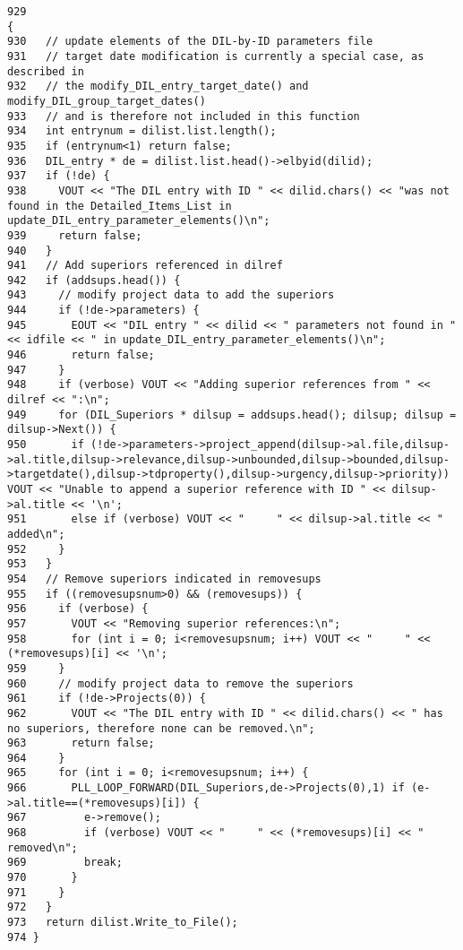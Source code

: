 \footnotesize\begin{verbatim}929                                                                                                                                                                    {
930   // update elements of the DIL-by-ID parameters file
931   // target date modification is currently a special case, as described in
932   // the modify_DIL_entry_target_date() and modify_DIL_group_target_dates()
933   // and is therefore not included in this function
934   int entrynum = dilist.list.length();
935   if (entrynum<1) return false;
936   DIL_entry * de = dilist.list.head()->elbyid(dilid);
937   if (!de) {
938     VOUT << "The DIL entry with ID " << dilid.chars() << "was not found in the Detailed_Items_List in update_DIL_entry_parameter_elements()\n";
939     return false;
940   }
941   // Add superiors referenced in dilref
942   if (addsups.head()) {
943     // modify project data to add the superiors
944     if (!de->parameters) {
945       EOUT << "DIL entry " << dilid << " parameters not found in " << idfile << " in update_DIL_entry_parameter_elements()\n";
946       return false;
947     }
948     if (verbose) VOUT << "Adding superior references from " << dilref << ":\n";
949     for (DIL_Superiors * dilsup = addsups.head(); dilsup; dilsup = dilsup->Next()) {
950       if (!de->parameters->project_append(dilsup->al.file,dilsup->al.title,dilsup->relevance,dilsup->unbounded,dilsup->bounded,dilsup->targetdate(),dilsup->tdproperty(),dilsup->urgency,dilsup->priority)) VOUT << "Unable to append a superior reference with ID " << dilsup->al.title << '\n';
951       else if (verbose) VOUT << "     " << dilsup->al.title << " added\n";
952     }
953   }
954   // Remove superiors indicated in removesups
955   if ((removesupsnum>0) && (removesups)) {
956     if (verbose) {
957       VOUT << "Removing superior references:\n";
958       for (int i = 0; i<removesupsnum; i++) VOUT << "     " << (*removesups)[i] << '\n';
959     }
960     // modify project data to remove the superiors
961     if (!de->Projects(0)) {
962       VOUT << "The DIL entry with ID " << dilid.chars() << " has no superiors, therefore none can be removed.\n";
963       return false;
964     }
965     for (int i = 0; i<removesupsnum; i++) {
966       PLL_LOOP_FORWARD(DIL_Superiors,de->Projects(0),1) if (e->al.title==(*removesups)[i]) {
967         e->remove();
968         if (verbose) VOUT << "     " << (*removesups)[i] << " removed\n";
969         break;
970       }
971     }
972   }
973   return dilist.Write_to_File();
974 }
\end{verbatim}\normalsize 
